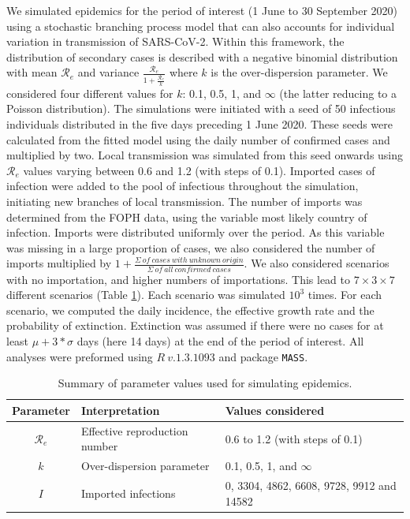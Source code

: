 \documentclass[10pt, a4paper, twoside]{article}
\begin{document}
\begin{multicols}{2}
We simulated epidemics for the period of interest (1 June to 30 September 2020) using a stochastic branching process model that can also accounts for individual variation in transmission of SARS-CoV-2.
Within this framework, the distribution of secondary cases is described with a negative binomial distribution with mean $\mathcal{R}_e$ and variance $\frac{\mathcal{R}_e}{1+\frac{\mathcal{R}_e}{k}}$ where $k$ is the over-dispersion parameter. 
We considered four different values for $k$: 0.1, 0.5, 1, and  $\infty$ (the latter reducing to a Poisson distribution). 
The simulations were initiated with a seed of 50 infectious individuals distributed in the five days preceding 1 June 2020.
These seeds were calculated from the fitted model using the daily number of confirmed cases and multiplied by two.
Local transmission was simulated from this seed onwards using $\mathcal{R}_e$ values varying between 0.6 and 1.2 (with steps of 0.1).
Imported cases of infection were added to the pool of infectious throughout the simulation, initiating new branches of local transmission.
The number of imports was determined from the FOPH data, using the variable most likely country of infection.
Imports were distributed uniformly over the period.
As this variable was missing in a large proportion of cases, we also considered the number of imports multiplied by $1+ \frac{\Sigma ~of ~cases ~with ~unknown ~origin }{\Sigma ~of ~all ~confirmed ~cases}$. 
We also considered scenarios with no importation, and higher numbers of importations.
This lead to $7 \times 3 \times 7 $ different scenarios (Table \ref{t1}).
Each scenario was simulated $10^3$ times.
For each scenario, we computed the daily incidence, the effective growth rate and the probability of extinction.
Extinction was assumed if there were no cases for at least $\mu + 3*\sigma$ days (here 14 days) at the end of the period of interest.
All analyses were preformed using $R ~v.1.3.1093$ and package \texttt{MASS}.\cite{r_core_team_r_2020,venables_modern_2002}

\end{multicols}
\begin{table}
	\centering
\caption{Summary of parameter values used for simulating epidemics.}
\label{t1}
\begin{tabular}{cll}
	\hline
	Parameter & Interpretation & Values considered\\
	\hline
	$\mathcal{R}_e$ & Effective reproduction number & 0.6 to 1.2 (with steps of 0.1) \\
	$k$ & Over-dispersion parameter & 0.1, 0.5, 1, and  $\infty$ \\
	$I$ & Imported infections & 0, 3304, 4862, 6608, 9728, 9912 and 14582  \\
	\hline
\end{tabular}
\end{table}
\end{document}
